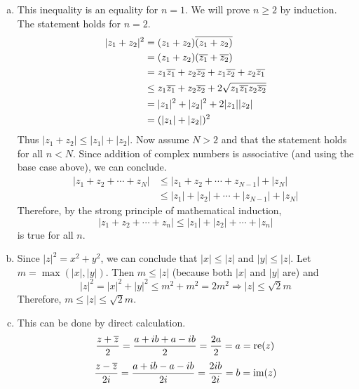 \documentclass[../../Solutions.tex]{subfiles}
\begin{document}
\begin{itemize}
\begin{enumerate}[(a)]
			\item This inequality is an equality for $n=1$.
			We will prove $n \geq 2$ by induction.
			The statement holds for $n=2$.
			\begin{equation*} \begin{split}
				|z_1+z_2|^2 & = (z_1+z_2)\overline{(z_1+z_2)} \\
							& = (z_1+z_2)(\overline{z_1}+\overline{z_2}) \\
							& = z_1\overline{z_1} + z_2\overline{z_2}+z_1\overline{z_2}+z_2\overline{z_1} \\
							& \leq z_1\overline{z_1} + z_2\overline{z_2} + 2\sqrt{z_1\overline{z_1}z_2\overline{z_2}} \\
							& = |z_1|^2 + |z_2|^2 + 2|z_1||z_2| \\
							& = (|z_1|+|z_2|)^2
			\end{split} \end{equation*}
			Thus $|z_1+z_2| \leq |z_1|+|z_2|$.
			Now assume $N > 2$ and that the statement holds for all $n < N$.
			Since addition of complex numbers is associative (and using the base case above), we can conclude.
			\begin{equation*} \begin{split}
				|z_1 + z_2 + \cdots +z_N| & \leq |z_1+z_2+ \cdots +z_{N-1}|+|z_N| \\
										  & \leq |z_1|+|z_2|+\cdots+|z_{N-1}|+|z_N|
			\end{split} \end{equation*}
			Therefore, by the strong principle of mathematical induction,
			$$ |z_1+z_2+\cdots+z_n|\leq|z_1|+|z_2|+\cdots+|z_n| $$
			is true for all $n$.
			
			\item Since $|z|^2 = x^2+y^2$, we can conclude that $|x| \leq |z|$ and $|y| \leq |z|$. Let $m = \max(|x|,|y|)$. Then $m \leq |z|$ (because both $|x|$ and $|y|$ are) and
			$$ |z|^2 = |x|^2+|y|^2 \leq m^2+m^2 = 2m^2 \Rightarrow |z| \leq \sqrt{2}m $$
			Therefore, $m \leq |z| \leq \sqrt{2}m$.
			
			\item This can be done by direct calculation.
			$$ \frac{z+\overline{z}}{2} = \frac{a+ib+a-ib}{2} = \frac{2a}{2} = a = \text{re}(z) $$
			$$ \frac{z-\overline{z}}{2i} = \frac{a+ib-a-ib}{2i} = \frac{2ib}{2i} = b = \text{im}(z) $$	
		\end{enumerate}
	

\end{itemize}
\end{document}
